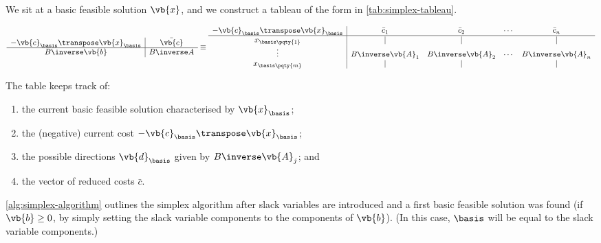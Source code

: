 We sit at a basic feasible solution \(\vb{x}\), and we construct a tableau of the form in \autoref{tab:simplex-tableau}.

\begin{table}[ht!]
    \centering
    \[\begin{array}{c|c}
        - \vb{c}_{\basis}\transpose \vb{x}_{\basis} & \bar{\vb{c}} \\
        \hline
        B\inverse \vb{b} & B\inverse A
    \end{array}
    \equiv
    \begin{array}{c|cccc}
        - \vb{c}_{\basis}\transpose \vb{x}_{\basis} & \bar{c}_1 & \bar{c}_2 & \cdots & \bar{c}_n \\
        \hline
        x_{\basis\pqty{1}} & | & | & & | \\
        \vdots & B\inverse \vb{A}_1 & B\inverse \vb{A}_2 & \cdots & B\inverse \vb{A}_n \\
        x_{\basis\pqty{m}} & | & | & & |
    \end{array}
    \]
    \caption{Simplex Tableau}
    \label{tab:simplex-tableau}
\end{table}

The table keeps track of:
\begin{enumerate}
    \item the current basic feasible solution characterised by \(\vb{x}_{\basis}\);
    \item the (negative) current cost \(- \vb{c}_{\basis}\transpose \vb{x}_{\basis}\);
    \item the possible directions \(\vb{d}_{\basis}\) given by \(B\inverse \vb{A}_j\); and
    \item the vector of reduced costs \(\bar{c}\).
\end{enumerate}

\autoref{alg:simplex-algorithm} outlines the simplex algorithm after slack variables are introduced and a first basic feasible solution was found (if \(\vb{b} \geq 0\), by simply setting the slack variable components to the components of \(\vb{b}\)). (In this case, \(\basis\) will be equal to the slack variable components.)

